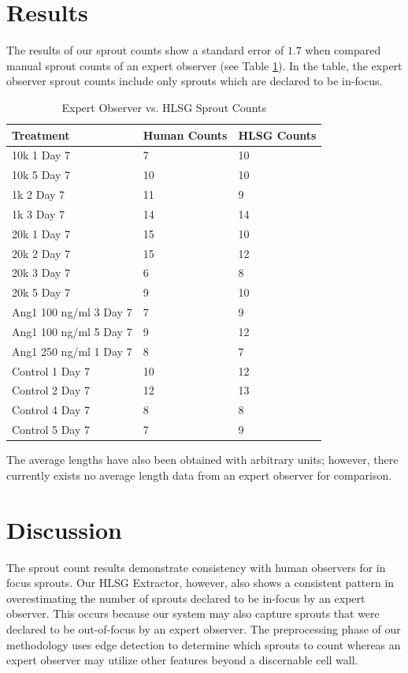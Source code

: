 \documentclass{sig-alternate}
\begin{document}
\section{Results} %
\label{sec:Results}
	The results of our sprout counts show a standard error of $1.7$ when
	compared manual sprout counts of an expert observer (see Table
	\ref{tab:resultcomp}). In the table, the expert observer sprout counts
	include only sprouts which are declared to be in-focus.

	\begin{table}[htp]
		\centering
		\begin{tabular}{| l | l | l |}
			\hline
			\textbf{Treatment} & \textbf{Human Counts} & \textbf{HLSG Counts} \\\hline
			10k 1 Day 7 & 7  & 10 \\\hline
			10k 5 Day 7 & 10 &  10 \\\hline
			1k 2 Day 7 & 11 & 9 \\\hline
			1k 3 Day 7 & 14 & 14 \\\hline
			20k 1 Day 7 & 15 & 10 \\\hline
			20k 2 Day 7 & 15 & 12 \\\hline
			20k 3 Day 7 & 6 & 8 \\\hline
			20k 5 Day 7 & 9 & 10 \\\hline
			Ang1 100 ng/ml 3 Day 7 & 7 & 9 \\\hline
			Ang1 100 ng/ml 5 Day 7 & 9 & 12 \\\hline
			Ang1 250 ng/ml 1 Day 7 & 8 & 7\\\hline
			Control 1 Day 7 & 10 & 12 \\\hline
			Control 2 Day 7 & 12 & 13 \\\hline
			Control 4 Day 7 & 8 & 8 \\\hline
			Control 5 Day 7 & 7 & 9 \\\hline
		\end{tabular}
		\caption{Expert Observer vs. HLSG Sprout Counts}
		\label{tab:resultcomp}
	\end{table}

	The average lengths have also been obtained with arbitrary units;
	however, there currently exists no average length data from an expert
	observer for comparison.

\section{Discussion} %
\label{sec:Discussion}
	The sprout count results demonstrate consistency with human observers
	for in focus sprouts. Our HLSG Extractor, however, also shows a
	consistent pattern in overestimating the number of sprouts
	declared to be in-focus by an expert observer. This occurs because
	our system may also capture sprouts that were declared to be
	out-of-focus by an expert observer. The preprocessing phase of our
	methodology uses edge detection to determine which sprouts to
	count whereas an expert observer may utilize other features beyond
	a discernable cell wall.
\end{document}
